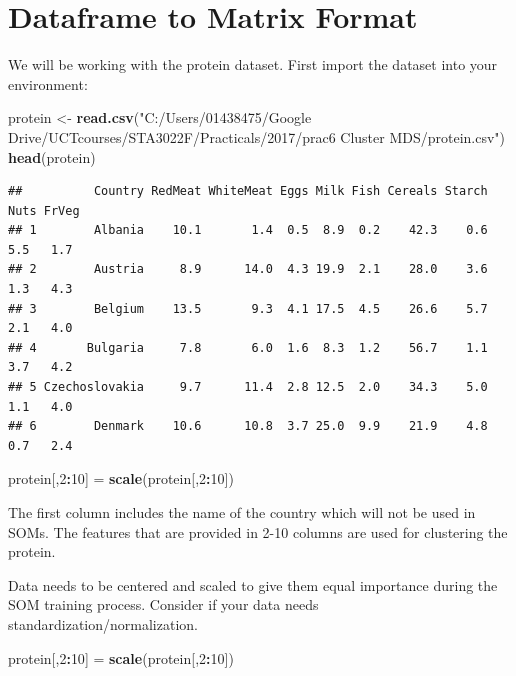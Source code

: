 \documentclass[
]{book}
\newenvironment{Shaded}{\begin{snugshade}}{\end{snugshade}}
\newcommand{\DecValTok}[1]{\textcolor[rgb]{0.00,0.00,0.81}{#1}}
\newcommand{\KeywordTok}[1]{\textcolor[rgb]{0.13,0.29,0.53}{\textbf{#1}}}
\newcommand{\NormalTok}[1]{#1}
\newcommand{\OperatorTok}[1]{\textcolor[rgb]{0.81,0.36,0.00}{\textbf{#1}}}
\newcommand{\StringTok}[1]{\textcolor[rgb]{0.31,0.60,0.02}{#1}}
\begin{document}
\hypertarget{dataframe-to-matrix-format}{%
\section{Dataframe to Matrix Format}\label{dataframe-to-matrix-format}}

We will be working with the protein dataset. First import the dataset into your environment:

\begin{Shaded}
\begin{Highlighting}[]
\NormalTok{protein <-}\StringTok{ }\KeywordTok{read.csv}\NormalTok{(}\StringTok{"C:/Users/01438475/Google Drive/UCTcourses/STA3022F/Practicals/2017/prac6 Cluster MDS/protein.csv"}\NormalTok{)}
\KeywordTok{head}\NormalTok{(protein)}
\end{Highlighting}
\end{Shaded}

\begin{verbatim}
##          Country RedMeat WhiteMeat Eggs Milk Fish Cereals Starch Nuts FrVeg
## 1        Albania    10.1       1.4  0.5  8.9  0.2    42.3    0.6  5.5   1.7
## 2        Austria     8.9      14.0  4.3 19.9  2.1    28.0    3.6  1.3   4.3
## 3        Belgium    13.5       9.3  4.1 17.5  4.5    26.6    5.7  2.1   4.0
## 4       Bulgaria     7.8       6.0  1.6  8.3  1.2    56.7    1.1  3.7   4.2
## 5 Czechoslovakia     9.7      11.4  2.8 12.5  2.0    34.3    5.0  1.1   4.0
## 6        Denmark    10.6      10.8  3.7 25.0  9.9    21.9    4.8  0.7   2.4
\end{verbatim}

\begin{Shaded}
\begin{Highlighting}[]
\NormalTok{protein[,}\DecValTok{2}\OperatorTok{:}\DecValTok{10}\NormalTok{] =}\StringTok{ }\KeywordTok{scale}\NormalTok{(protein[,}\DecValTok{2}\OperatorTok{:}\DecValTok{10}\NormalTok{])}
\end{Highlighting}
\end{Shaded}

The first column includes the name of the country which will not be used in SOMs. The features that are provided in 2-10 columns are used for clustering the protein.

Data needs to be centered and scaled to give them equal importance during the SOM training process. Consider if your data needs standardization/normalization.

\begin{Shaded}
\begin{Highlighting}[]
\NormalTok{protein[,}\DecValTok{2}\OperatorTok{:}\DecValTok{10}\NormalTok{] =}\StringTok{ }\KeywordTok{scale}\NormalTok{(protein[,}\DecValTok{2}\OperatorTok{:}\DecValTok{10}\NormalTok{])}
\end{Highlighting}
\end{Shaded}
\end{document}
